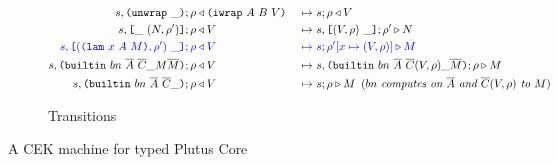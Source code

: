 \documentclass[../plutus-core-specification.tex]{subfiles}
\begin{document}
\begin{figure}[!ht]
\begin{subfigure}[c]{\linewidth}
\begin{alignat*}{2}
       s,\texttt{(} \texttt{unwrap} ~ \_ \texttt{)}{}; \rho                   &\triangleleft \texttt{(} \texttt{iwrap} ~ A ~ B ~ V \texttt{)} &~\mapsto~& s;\rho \triangleleft V\\
       s,\texttt{[} \_ ~ (N,\rho^{\prime}) \texttt{]}; \rho   &\triangleleft V &~\mapsto~& s, \texttt{[} (V,\rho) ~ \_ \texttt{]};\rho^{\prime} \triangleright N\\
       \textcolor{blue}{s,\texttt{[} (\texttt{(} \texttt{lam} ~ x ~ A ~ M \texttt{)}, \rho^{\prime}) ~ \_ \texttt{]}; \rho}
                                  &\color{blue}\triangleleft V &~\color{blue}\mapsto~& \textcolor{blue}{s;\rho^{\prime}[x\mapsto (V,\rho)] \triangleright M}\\
       s,  \texttt{(} \texttt{builtin} ~ bn ~ \overline{A} ~ \overline{C} \_ M \overline{M} \texttt{)}{}; \rho
                                  &\triangleleft V &~\mapsto~& s, \texttt{(} \texttt{builtin} ~ bn ~ \overline{A} ~ \overline{C}(V,\rho) \_ \overline{M} \texttt{)};\rho \triangleright M\\
       s,\texttt{(} \texttt{builtin} ~ bn ~ \overline{A} ~ \overline{C} \_  \texttt{)}; \rho &\triangleleft V 
                                                  &~\mapsto~& s;\rho \triangleright M \enspace (\textit{$bn$ computes on $\overline{A}$ and $\overline{C}(V,\rho)$ to $M$})\\
\end{alignat*}
\caption{Transitions}
\end{subfigure}
\caption{A CEK machine for typed Plutus Core}
\label{fig:cek-machine}
\end{figure}
\end{document}
